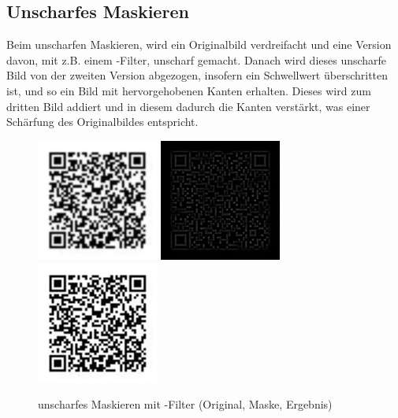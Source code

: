\subsection*{Unscharfes Maskieren}
\label{sec:unsharp}
Beim unscharfen Maskieren, wird ein Originalbild verdreifacht und eine Version davon, mit z.B. einem -Filter, unscharf gemacht.
Danach wird dieses unscharfe Bild von der zweiten Version abgezogen, insofern ein Schwellwert überschritten ist, und so ein Bild mit hervorgehobenen Kanten erhalten.
Dieses wird zum dritten Bild addiert und in diesem dadurch die Kanten verstärkt, was einer Schärfung des Originalbildes entspricht.
\begin{figure}[H]
  \centering
  \includegraphics[height=4cm]{img/QR/blurry_03_3.jpg}
  \includegraphics[height=4cm]{img/QR/qr-unsharpmask.jpg}
  \includegraphics[height=4cm]{img/QR/qr-unsharpmask-sharp.jpg}
  \caption[unscharfes Maskieren mit -Filter]{unscharfes Maskieren mit -Filter (Original, Maske, Ergebnis)}
  \label{fig:unsharpmask}
\end{figure}


